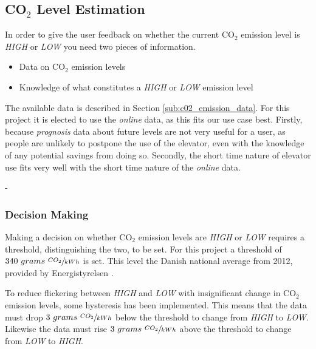 \documentclass[Main]{subfiles}
\begin{document}
\subsection{CO$_2$ Level Estimation} %
\label{sub:co__2_level_estimation}

	In order to give the user feedback on whether the current CO$_2$ emission level is \emph{HIGH} or \emph{LOW} you need two pieces of information.

	\begin{itemize}
		\item Data on CO$_2$ emission levels
		\item Knowledge of what constitutes a \emph{HIGH} or \emph{LOW} emission level
	\end{itemize}

	The available data is described in Section \ref{sub:c02_emission_data}.
	For this project it is elected to use the \emph{online} data, as this fits our use case best.
	Firstly, because \emph{prognosis} data about future levels are not very useful for a user, as people are unlikely to postpone the use of the elevator, even with the knowledge of any potential savings from doing so.
	Secondly, the short time nature of elevator use fits very well with the short time nature of the \emph{online} data.
 
-		%

	\subsubsection{Decision Making} %
	\label{sub:decision_making}

		Making a decision on whether CO$_2$ emission levels are \emph{HIGH} or \emph{LOW} requires a threshold, distinguishing the two, to be set.
		For this project a threshold of $340\ grams\ \sfrac{CO_2}{kWh}$ is set.
		This level the Danish national average from 2012, provided by Energistyrelsen \cite{Energistyrelsen:2012:Online}.

		To reduce flickering between \emph{HIGH} and \emph{LOW} with insignificant change in CO$_2$ emission levels, some hysteresis has been implemented.
		This means that the data must drop $3\ grams\ \sfrac{CO_2}{kWh}$ below the threshold to change from \emph{HIGH} to \emph{LOW}.
		Likewise the data must rise $3\ grams\ \sfrac{CO_2}{kWh}$ above the threshold to change from \emph{LOW} to \emph{HIGH}.
	
\end{document}
